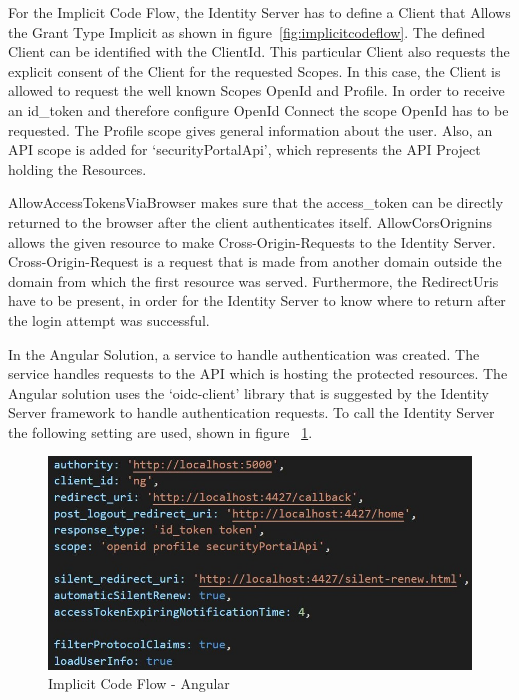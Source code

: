 For the Implicit Code Flow, the Identity Server has to define a Client that Allows the Grant Type Implicit as shown in figure~\ref{fig:implicitcodeflow}. The defined Client can be identified with the ClientId. This particular Client also requests the explicit consent of the Client for the requested Scopes. In this case, the Client is allowed to request the well known Scopes OpenId and Profile. In order to receive an id\_token and therefore configure OpenId Connect the scope OpenId has to be requested. The Profile scope gives general information about the user. Also, an API scope is added for ‘securityPortalApi’, which represents the API Project holding the Resources. 




AllowAccessTokensViaBrowser makes sure that the access\_token can be directly returned to the browser after the client authenticates itself. AllowCorsOrignins allows the given resource to make Cross-Origin-Requests to the Identity Server. Cross-Origin-Request is a request that is made from another domain outside the domain from which the first resource was served. Furthermore, the RedirectUris have to be present, in order for the Identity Server to know where to return after the login attempt was successful. 


In the Angular Solution, a service to handle authentication was created. The service handles requests to the API which is hosting the protected resources. The Angular solution uses the ‘oidc-client’ library that is suggested by the Identity Server framework to handle authentication requests. To call the Identity Server the following setting are used, shown in figure~ \ref{fig:implicitcodeflowangular}.

\begin{figure}[h]
	\centering
	\includegraphics[width=0.8\linewidth]{images/implicit_code_flow_angular}
	\caption{Implicit Code Flow - Angular}
	\label{fig:implicitcodeflowangular}
\end{figure}


